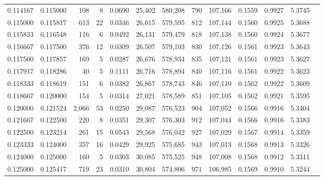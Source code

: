 \begin{tabular}{rrrrrrrrrrrrr}
0.114167 & 0.115000 &   108 &   8 &                                     0.0690 &  25,402 & 580,208 &     790 & 107,166 & 0.1559 & 0.9927 & 5.3745 \\
0.115000 & 0.115817 &   613 &  22 &                                     0.0346 &  26,015 & 579,595 &     812 & 107,144 & 0.1560 & 0.9925 & 5.3688 \\
0.115833 & 0.116548 &   116 &   6 &                                     0.0492 &  26,131 & 579,479 &     818 & 107,138 & 0.1560 & 0.9924 & 5.3677 \\
0.116667 & 0.117500 &   376 &  12 &                                     0.0309 &  26,507 & 579,103 &     830 & 107,126 & 0.1561 & 0.9923 & 5.3643 \\
0.117500 & 0.117857 &   169 &   5 &                                     0.0287 &  26,676 & 578,934 &     835 & 107,121 & 0.1561 & 0.9923 & 5.3627 \\
0.117917 & 0.118286 &    40 &   5 &                                     0.1111 &  26,716 & 578,894 &     840 & 107,116 & 0.1561 & 0.9922 & 5.3623 \\
0.118333 & 0.118619 &   151 &   6 &                                     0.0382 &  26,867 & 578,743 &     846 & 107,110 & 0.1562 & 0.9922 & 5.3609 \\
0.118667 & 0.120000 &   154 &   5 &                                     0.0314 &  27,021 & 578,589 &     851 & 107,105 & 0.1562 & 0.9921 & 5.3595 \\
0.120000 & 0.121524 & 2,066 &  53 &                                     0.0250 &  29,087 & 576,523 &     904 & 107,052 & 0.1566 & 0.9916 & 5.3404 \\
0.121667 & 0.122500 &   220 &   8 &                                     0.0351 &  29,307 & 576,303 &     912 & 107,044 & 0.1566 & 0.9916 & 5.3383 \\
0.122500 & 0.123214 &   261 &  15 &                                     0.0543 &  29,568 & 576,042 &     927 & 107,029 & 0.1567 & 0.9914 & 5.3359 \\
0.123333 & 0.124000 &   357 &  16 &                                     0.0429 &  29,925 & 575,685 &     943 & 107,013 & 0.1568 & 0.9913 & 5.3326 \\
0.124000 & 0.125000 &   160 &   5 &                                     0.0303 &  30,085 & 575,525 &     948 & 107,008 & 0.1568 & 0.9912 & 5.3311 \\
0.125000 & 0.125417 &   719 &  23 &                                     0.0310 &  30,804 & 574,806 &     971 & 106,985 & 0.1569 & 0.9910 & 5.3244 \\

\end{tabular}
